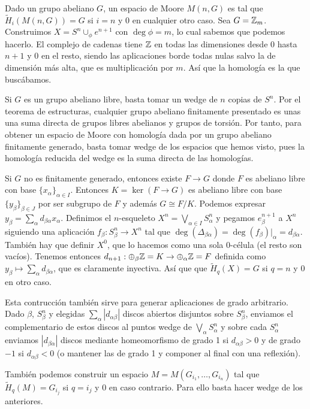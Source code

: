 \documentclass[TA.tex]{subfiles}
\begin{document}
\begin{ej}
Dado un grupo abeliano $G$, un espacio de Moore $M(n,G)$ es tal que $\widetilde{H}_i(M(n,G))=G$ si $i=n$ y 0 en cualquier otro caso. Sea $G=\mathbb{Z}_m$. Construimos $X=S^n\cup_{\phi}e^{n+1}$ con $\deg\phi=m$, lo cual sabemos que podemos hacerlo. El complejo de cadenas tiene $\mathbb{Z}$ en todas las dimensiones desde 0 hasta $n+1$ y 0 en el resto, siendo las aplicaciones borde todas nulas salvo la de dimensión más alta, que es multiplicación por $m$. Así que la homología es la que buscábamos.

Si $G$ es un grupo abeliano libre, basta tomar un wedge de $n$ copias de $S^n$. Por el teorema de estructuras, cualquier grupo abeliano finitamente presentado es unas una suma directa de grupos libres abelianos y grupos de torsión. Por tanto, para obtener un espacio de Moore con homología dada por un grupo abeliano finitamente generado, basta tomar wedge de los espacios que hemos visto, pues la homología reducida del wedge es la suma directa de las homologías. 

Si $G$ no es finitamente generado, entonces existe $F\to G$ donde $F$ es abeliano libre con base $\{x_\alpha\}_{\alpha\in I}$. Entonces $K=\ker(F\to G)$ es abeliano libre con base $\{y_{\beta}\}_{\beta\in J}$ por ser subgrupo de $F$ y además $G\cong F/K$. Podemos expresar $y_\beta=\sum_{\alpha}d_{\beta\alpha}x_\alpha$. Definimos el $n$-esqueleto $X^n=\bigvee_{\alpha\in I} S^n_{\alpha}$ y pegamos $e^{n+1}_{\beta}$ a $X^n$ siguiendo una aplicación $f_\beta:S^n_{\beta}\to X^n$ tal que $\deg(\Delta_{\beta\alpha})=\deg(f_{\beta})|_{\alpha}=d_{\beta\alpha}$. También hay que definir $X^0$, que lo hacemos como una sola 0-célula (el resto son vacíos). Tenemos entonces $d_{n+1}:\oplus_{\beta}\mathbb{Z}=K\to \oplus_{\alpha}\mathbb{Z}=F$ definida como $y_\beta\mapsto \sum_{\alpha}d_{\beta\alpha}$, que es claramente inyectiva. Así que que $\widetilde{H}_q(X)=G$ si $q=n$ y 0 en otro caso. 

Esta contrucción también sirve para generar aplicaciones de grado arbitrario. Dado $\beta$, $S^n_{\beta}$ y elegidas $\sum_{\alpha}|d_{\alpha\beta}|$ discos abiertos disjuntos sobre $S^n_{\beta}$, enviamos el complementario de estos discos al puntos wedge de $\bigvee_\alpha S^n_{\alpha}$ y sobre cada $S^n_{\alpha}$ enviamos $|d_{\beta\alpha}|$ discos mediante homeomorfismo de grado 1 si $d_{\alpha\beta}>0$ y de grado $-1$ si $d_{\alpha\beta}<0$ (o mantener las de grado 1 y componer al final con una reflexión).

También podemos construir un espacio $M=M(G_{i_1},\dots, G_{i_n})$ tal que $\widetilde{H}_q(M)=G_{i_j}$ si $q=i_j$ y 0 en caso contrario. Para ello basta hacer wedge de los anteriores.
\end{ej}
\end{document}
